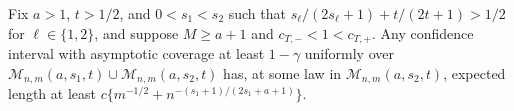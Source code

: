 Fix \(a>1\), \(t>1/2\), and \(0<s_1<s_2\) such that \(s_\ell/(2s_\ell+1)+t/(2t+1)>1/2\) for \(\ell\in\{1,2\}\), and suppose \(M\ge a+1\) and \(c_{T,-}<1<c_{T,+}\). Any confidence interval with asymptotic coverage at least \(1-\gamma\) uniformly over \(\mathcal M_{n,m}(a,s_1,t)\cup\mathcal M_{n,m}(a,s_2,t)\) has, at some law in \(\mathcal M_{n,m}(a,s_2,t)\), expected length at least \(c\{m^{-1/2}+n^{-(s_1+1)/(2s_1+a+1)}\}\).